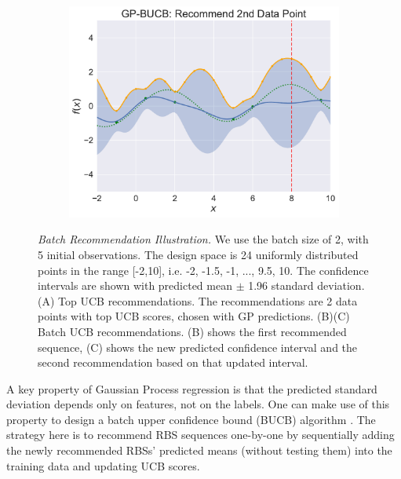 \documentclass{scrartcl}[2013/05/29]%
\begin{document}
\begin{figure}
\begin{subfigure}[b]{0.49\textwidth}
        \includegraphics[scale=0.4]{plots/Main_Paper/GP-BUCB_Recommend_2nd_Data_Point.pdf}
    \end{subfigure}
    \caption{\emph{Batch Recommendation Illustration.} We use the batch size of 2, with 5 initial observations. The design space is 24 uniformly distributed points in the range [-2,10], i.e. {-2, -1.5, -1, ..., 9.5, 10}.
    The confidence intervals are shown with predicted mean $\pm$ 1.96 standard deviation.
    (A) Top UCB recommendations. The recommendations are 2 data points with top UCB scores, chosen with GP predictions.
    (B)(C) Batch UCB recommendations. (B) shows the first recommended sequence, (C) shows the new predicted confidence interval and the second recommendation based on that updated interval.}
    \label{fig:batch rec}
\end{figure}


A key property of Gaussian Process regression is that the predicted standard deviation depends only on features, not on the labels. 
One can make use of this property to design a batch upper confidence bound (BUCB) algorithm \cite{desautels2014parallelizing}.
The strategy here is to recommend RBS sequences one-by-one by sequentially adding the newly recommended RBSs' predicted means (without testing them) into the training data and updating UCB scores.\\
\end{document}
